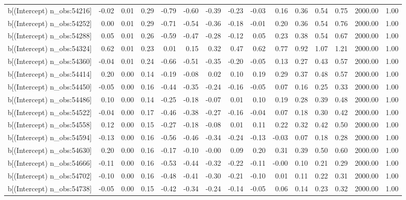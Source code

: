 \begin{table}[ht]
\begin{tabular}{rrrrrrrrrrrrrrr}
  b[(Intercept) n\_obs:54216] & -0.02 & 0.01 & 0.29 & -0.79 & -0.60 & -0.39 & -0.23 & -0.03 & 0.16 & 0.36 & 0.54 & 0.75 & 2000.00 & 1.00 \\ 
  b[(Intercept) n\_obs:54252] & 0.00 & 0.01 & 0.29 & -0.71 & -0.54 & -0.36 & -0.18 & -0.01 & 0.20 & 0.36 & 0.54 & 0.76 & 2000.00 & 1.00 \\ 
  b[(Intercept) n\_obs:54288] & 0.05 & 0.01 & 0.26 & -0.59 & -0.47 & -0.28 & -0.12 & 0.05 & 0.23 & 0.38 & 0.54 & 0.67 & 2000.00 & 1.00 \\ 
  b[(Intercept) n\_obs:54324] & 0.62 & 0.01 & 0.23 & 0.01 & 0.15 & 0.32 & 0.47 & 0.62 & 0.77 & 0.92 & 1.07 & 1.21 & 2000.00 & 1.00 \\ 
  b[(Intercept) n\_obs:54360] & -0.04 & 0.01 & 0.24 & -0.66 & -0.51 & -0.35 & -0.20 & -0.05 & 0.13 & 0.27 & 0.43 & 0.57 & 2000.00 & 1.00 \\ 
  b[(Intercept) n\_obs:54414] & 0.20 & 0.00 & 0.14 & -0.19 & -0.08 & 0.02 & 0.10 & 0.19 & 0.29 & 0.37 & 0.48 & 0.57 & 2000.00 & 1.00 \\ 
  b[(Intercept) n\_obs:54450] & -0.05 & 0.00 & 0.16 & -0.44 & -0.35 & -0.24 & -0.16 & -0.05 & 0.07 & 0.16 & 0.25 & 0.33 & 2000.00 & 1.00 \\ 
  b[(Intercept) n\_obs:54486] & 0.10 & 0.00 & 0.14 & -0.25 & -0.18 & -0.07 & 0.01 & 0.10 & 0.19 & 0.28 & 0.39 & 0.48 & 2000.00 & 1.00 \\ 
  b[(Intercept) n\_obs:54522] & -0.04 & 0.00 & 0.17 & -0.46 & -0.38 & -0.27 & -0.16 & -0.04 & 0.07 & 0.18 & 0.30 & 0.42 & 2000.00 & 1.00 \\ 
  b[(Intercept) n\_obs:54558] & 0.12 & 0.00 & 0.15 & -0.27 & -0.18 & -0.08 & 0.01 & 0.11 & 0.22 & 0.32 & 0.42 & 0.50 & 2000.00 & 1.00 \\ 
  b[(Intercept) n\_obs:54594] & -0.13 & 0.00 & 0.16 & -0.56 & -0.46 & -0.34 & -0.24 & -0.13 & -0.03 & 0.07 & 0.18 & 0.28 & 2000.00 & 1.00 \\ 
  b[(Intercept) n\_obs:54630] & 0.20 & 0.00 & 0.16 & -0.17 & -0.10 & -0.00 & 0.09 & 0.20 & 0.31 & 0.39 & 0.50 & 0.60 & 2000.00 & 1.00 \\ 
  b[(Intercept) n\_obs:54666] & -0.11 & 0.00 & 0.16 & -0.53 & -0.44 & -0.32 & -0.22 & -0.11 & -0.00 & 0.10 & 0.21 & 0.29 & 2000.00 & 1.00 \\ 
  b[(Intercept) n\_obs:54702] & -0.10 & 0.00 & 0.16 & -0.48 & -0.41 & -0.30 & -0.21 & -0.10 & 0.01 & 0.11 & 0.22 & 0.31 & 2000.00 & 1.00 \\ 
  b[(Intercept) n\_obs:54738] & -0.05 & 0.00 & 0.15 & -0.42 & -0.34 & -0.24 & -0.14 & -0.05 & 0.06 & 0.14 & 0.23 & 0.32 & 2000.00 & 1.00 \\ 

\end{tabular}
\end{table}
